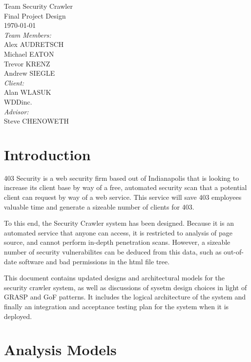 \documentclass{article}
\begin{document}
\fancyhf{}
\rhead{\today}

\begin{titlepage}
\begin{center}
{\huge Team Security Crawler}\\[2cm]
{\Large Final Project Design}\\[2cm]
{\large \today}\\[2cm]
\emph{Team Members:}\\
Alex \uppercase{Audretsch}\\
Michael \uppercase{Eaton}\\
Trevor \uppercase{Krenz}\\
Andrew \uppercase{Siegle}\\[1cm]
\emph{Client:}\\
Alan WLASUK\\
WDDinc.\\[1cm]
\emph{Advisor:}\\
Steve CHENOWETH

\end{center}
\end{titlepage}
\tableofcontents
\newpage
\section{Introduction}

403 Security is a web security firm based out of Indianapolis that is looking to increase its client base by way of a free, automated security scan that a potential client can request by way of a web service.  This service will save 403 employees valuable time and generate a sizeable number of clients for 403.

To this end, the Security Crawler system has been designed.  Because it is an automated service that anyone can access, it is restricted to analysis of page source, and cannot perform in-depth penetration scans.  However, a sizeable number of security vulnerabilites can be deduced from this data, such as out-of-date software and bad permissions in the html file tree.

This document contains updated designs and architectural models for the security crawler system, as well as discussions of sysetm design choices in light of GRASP and GoF patterns.  It includes the logical architecture of the system and finally an integration and acceptance testing plan for the system when it is deployed.

\newpage
\section{Analysis Models}
\end{document}
